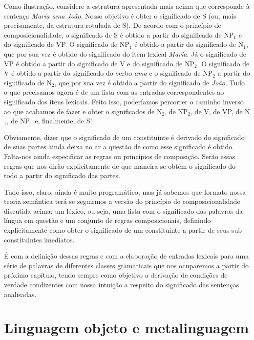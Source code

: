 Como ilustra\-ção, considere a estrutura apresentada mais acima
que corresponde à sentença \textit{Maria ama João}. Nosso objetivo é
obter o significado de S (ou, mais precisamente, da estrutura
rotulada de S). De acordo com o prin\-cí\-pio de
composicionalidade, o significado de S é obtido a partir do
significado de NP$_{1}$ e do significado de VP. O significado de
NP$_{1}$ é obtido a partir do significado de N$_{1}$, que por sua vez
é obtido do significado do item lexical \textit{Maria}. Já o
significado de VP é obtido a partir do significado de V e do
significado de NP$_{2}$. O significado de V é obtido a partir do
significado do verbo \textit{ama} e o significado de NP$_{2}$ a
partir do significado de N$_{2}$, que por sua vez é obtido a partir
do significado de \textit{João}. Tudo o que precisamos agora é de
um lista com as entradas correspondentes ao significado dos itens
lexicais. Feito isso, poderíamos percorrer o caminho inverso ao
que acabamos de fazer e obter o significados de N$_{2}$, de NP$_{2}$,
de V, de VP, de N$_{1}$, de NP$_{1}$ e, finalmente, de S!

Obviamente, dizer que o significado de um constituinte é derivado
do significado de suas partes ainda deixa no ar a questão de como
esse significado é obtido. Falta-nos ainda especificar as regras
ou prin\-cí\-pi\-os de composi\-ção. Serão essas regras que nos
dirão explicitamente de que maneira se obtém o significado do todo a partir do significado das partes.

Tudo isso, claro, ainda é muito programático, mas já sabemos que
formato nossa teoria semântica terá se seguirmos a versão do
prin\-cí\-pio de composicionalidade discutida acima: um léxico, ou
seja, uma lista com o significado das palavras da língua em
questão e um conjunto de regras composicionais, definindo
explicitamente como obter o significado de um constituinte a
partir de seus sub-constituintes imediatos.

É com a defini\-ção dessas regras e com a elabora\-ção de entradas
lexicais para uma série de palavras de diferentes classes
gramaticais que nos ocuparemos a partir do próximo capítulo, tendo
sempre como objetivo a deriva\-ção de condi\-çõ\-es de verdade
condizentes com nossa intui\-ção a respeito do significado das
sen\-ten\-ças analisadas.

\section{Linguagem objeto e metalinguagem}

